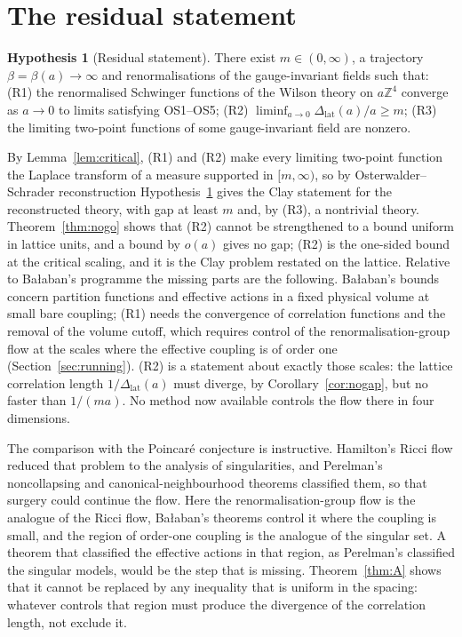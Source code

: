 \documentclass[aps,prd,twocolumn,superscriptaddress,nofootinbib,floatfix]{revtex4-2}
\theoremstyle{definition}
\newtheorem{hypothesis}[theorem]{Hypothesis}
\theoremstyle{remark}
\newcommand{\Z}{\mathbb{Z}}
\newcommand{\Dlat}{\Delta_{\mathrm{lat}}}
\begin{document}
\section{The residual statement}
\label{sec:residual}

\begin{hypothesis}[Residual statement]
\label{hyp:R}
There exist $m\in(0,\infty)$, a trajectory $\beta=\beta(a)\to\infty$ and
renormalisations of the gauge-invariant fields such that:
\textup{(R1)} the renormalised Schwinger functions of the Wilson theory on
$a\Z^4$ converge as $a\to0$ to limits satisfying OS1--OS5;
\textup{(R2)} $\liminf_{a\to0}\Dlat(a)/a\ge m$;
\textup{(R3)} the limiting two-point functions of some gauge-invariant
field are nonzero.
\end{hypothesis}

By Lemma~\ref{lem:critical}, (R1) and (R2) make every limiting
two-point function the Laplace transform of a measure supported in
$[m,\infty)$, so by Osterwalder--Schrader reconstruction
Hypothesis~\ref{hyp:R} gives the Clay statement for the reconstructed
theory, with gap at least $m$ and, by (R3), a nontrivial theory. Theorem~\ref{thm:nogo}
shows that (R2) cannot be strengthened to a bound uniform in lattice units,
and a bound by $o(a)$ gives no gap; (R2) is the one-sided bound at the
critical scaling, and it is the Clay problem restated on the lattice.
Relative to Ba{\l}aban's programme the missing parts are the following.
Ba{\l}aban's bounds concern partition functions and effective actions in a
fixed physical volume at small bare coupling; (R1) needs the convergence of
correlation functions and the removal of the volume cutoff, which requires
control of the renormalisation-group flow at the scales where the
effective coupling is of order one (Section~\ref{sec:running}). (R2) is a
statement about exactly those scales: the lattice correlation length
$1/\Dlat(a)$ must diverge, by Corollary~\ref{cor:nogap}, but no faster
than $1/(ma)$. No method now available controls
the flow there in four dimensions.

The comparison with the Poincar\'e conjecture is instructive. Hamilton's
Ricci flow reduced that problem to the analysis of singularities, and
Perelman's noncollapsing and canonical-neighbourhood theorems classified
them, so that surgery could continue the flow. Here the
renormalisation-group flow is the analogue of the Ricci flow, Ba{\l}aban's
theorems control it where the coupling is small, and the region of order-one
coupling is the analogue of the singular set. A theorem that classified the
effective actions in that region, as Perelman's classified the singular
models, would be the step that is missing. Theorem~\ref{thm:A} shows that it
cannot be replaced by any inequality that is uniform in the spacing:
whatever controls that region must produce the divergence of the
correlation length, not exclude it.
\end{document}
